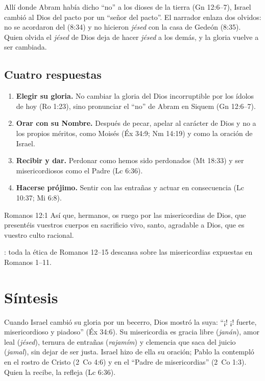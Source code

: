 Allí donde Abram había dicho ``no'' a los dioses de la tierra (Gn 12:6--7), Israel cambió al Dios del pacto por un ``señor del pacto''. El narrador enlaza dos olvidos: no se acordaron del \SENOR{} (8:34) y no hicieron \emph{jésed} con la casa de Gedeón (8:35). Quien olvida el \emph{jésed} de Dios deja de hacer \emph{jésed} a los demás, y la gloria vuelve a ser cambiada.


\subsection{Cuatro respuestas}
\begin{enumerate}
\item \textbf{Elegir su gloria.} No cambiar la gloria del Dios incorruptible por los ídolos de hoy (Ro 1:23), sino pronunciar el ``no'' de Abram en Siquem (Gn 12:6--7).
\item \textbf{Orar con su Nombre.} Después de pecar, apelar al carácter de Dios y no a los propios méritos, como Moisés (Éx 34:9; Nm 14:19) y como la oración de Israel.
\item \textbf{Recibir y dar.} Perdonar como hemos sido perdonados (Mt 18:33) y ser misericordiosos como el Padre (Lc 6:36).
\item \textbf{Hacerse prójimo.} Sentir con las entrañas y actuar en consecuencia (Lc 10:37; Mi 6:8).
\end{enumerate}

\begin{verso}{Romanos 12:1}
Así que, hermanos, os ruego por las misericordias de Dios, que presentéis vuestros cuerpos en sacrificio vivo, santo, agradable a Dios, que es vuestro culto racional.
\end{verso}

: toda la ética de Romanos 12--15 descansa sobre las misericordias expuestas en Romanos 1--11.

\section{Síntesis}

\begin{tcolorbox}[colback=papiro,colframe=azul,boxrule=1pt,arc=3pt]
Cuando Israel cambió su gloria por un becerro, Dios mostró la suya: ``¡\SENOR! ¡\SENOR! fuerte, misericordioso y piadoso'' (Éx 34:6). Su misericordia es gracia libre (\emph{janán}), amor leal (\emph{jésed}), ternura de entrañas (\emph{rajamím}) y clemencia que saca del juicio (\emph{jamal}), sin dejar de ser justa. Israel hizo de ella su oración; Pablo la contempló en el rostro de Cristo (2~Co 4:6) y en el ``Padre de misericordias'' (2~Co 1:3). Quien la recibe, la refleja (Lc 6:36).
\end{tcolorbox}

